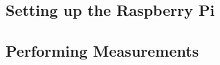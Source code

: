 \subsection{Setting up the Raspberry Pi}
\label{subsec:setupRaspbi}



\subsection{Performing Measurements}
\label{subsec:performingMeasurements}


